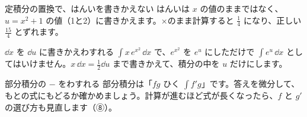 
\begin{tsumazuki}{定積分の置換で、はんいを書きかえない}
はんいは $x$ の値のままではなく、$u=x^2+1$ の値（1と2）に書きかえます。×のまま計算すると $\frac{1}{4}$ になり、正しい $\frac{15}{4}$ とずれます。
\end{tsumazuki}

\begin{tsumazuki}{$\dd x$ を $\dd u$ に書きかえわすれる}
$\displaystyle\int x\,e^{x^2}\,\dd x$ で、$e^{x^2}$ を $e^u$ にしただけで $\int e^u\,\dd x$ としてはいけません。$x\,\dd x=\frac{1}{2}\dd u$ まで書きかえて、積分の中を $u$ だけにします。
\end{tsumazuki}

\begin{tsumazuki}{部分積分の $-$ をわすれる}
部分積分は「$fg$ ひく $\int f'g$」です。答えを微分して、もとの式にもどるか確かめましょう。計算が進むほど式が長くなったら、$f$ と $g'$ の選び方も見直します（⑧）。
\end{tsumazuki}

